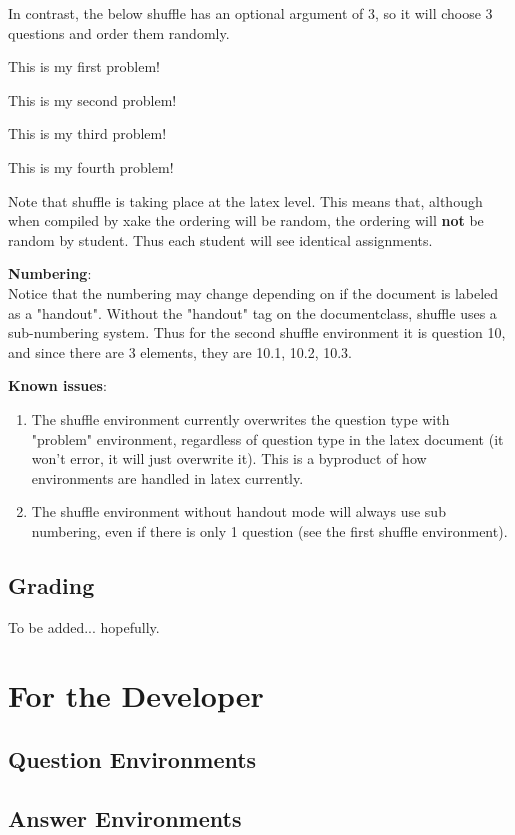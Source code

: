 \documentclass{ximera}
\begin{document}
In contrast, the below shuffle has an optional argument of 3, so it will choose 3 questions and order them randomly.

\begin{shuffle}[3]
\begin{problem}
This is my first problem!
\end{problem}

\begin{problem}
This is my second problem!
\end{problem}

\begin{problem}
This is my third problem!
\end{problem}

\begin{problem}
This is my fourth problem!
\end{problem}
\end{shuffle}

Note that shuffle is taking place at the latex level. This means that, although when compiled by xake the ordering will be random, the ordering will \textbf{not} be random by student. Thus each student will see identical assignments.

\textbf{Numbering}: \\
Notice that the numbering may change depending on if the document is labeled as a "handout". Without the "handout" tag on the documentclass, shuffle uses a sub-numbering system. Thus for the second shuffle environment it is question 10, and since there are 3 elements, they are 10.1, 10.2, 10.3.

\textbf{Known issues}:\\
\begin{enumerate}
\item The shuffle environment currently overwrites the question type with "problem" environment, regardless of question type in the latex document (it won't error, it will just overwrite it). This is a byproduct of how environments are handled in latex currently.
\item The shuffle environment without handout mode will always use sub numbering, even if there is only 1 question (see the first shuffle environment).
\end{enumerate}



\subsection{Grading}
To be added... hopefully.

\section{For the Developer}

\subsection{Question Environments}


\subsection{Answer Environments}
\end{document}

